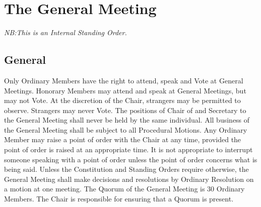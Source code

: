 \chapter{The General Meeting}
\hspace*{-10pt}\textit{NB:This is an Internal Standing Order.}
\section{General}
\npara Only Ordinary Members have the right to attend, speak and Vote at General Meetings. Honorary Members may attend and speak at General Meetings, but may not Vote.  At the discretion of the Chair, strangers may be permitted to observe. Strangers may never Vote.
\npara The positions of Chair of and Secretary to the General Meeting shall never be held by the same individual.
\npara All business of the General Meeting shall be subject to all Procedural Motions.
\npara Any Ordinary Member may raise a point of order with the Chair at any time, provided the point of order is raised at an appropriate time.  It is not appropriate to interrupt someone speaking with a point of order unless the point of order concerns what is being said.
\npara Unless the Constitution and Standing Orders require otherwise, the General Meeting shall make decisions and resolutions by Ordinary Resolution on a motion at one meeting.
\npara The Quorum of the General Meeting is 30 Ordinary Members. The Chair is responsible for ensuring that a Quorum is present.
